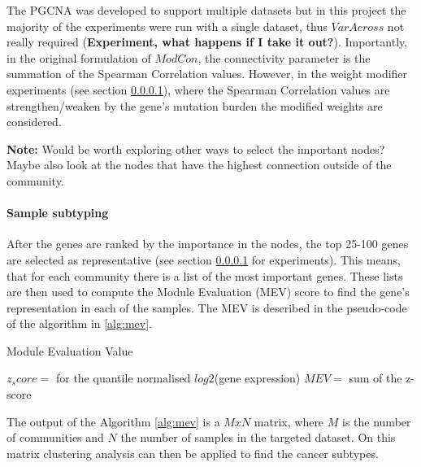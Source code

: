 The PGCNA was developed to support multiple datasets but in this project the majority of the experiments were run with a single dataset, thus $VarAcross$ not really required (\textbf{Experiment, what happens if I take it out?}). Importantly, in the original formulation of $ModCon$, the connectivity parameter is the summation of the Spearman Correlation values. However, in the weight modifier experiments (see section \ref{}), where the Spearman Correlation values are strengthen/weaken by the gene's mutation burden the modified weights are considered.

\textbf{Note:} Would be worth exploring other ways to select the important nodes? Maybe also look at the nodes that have the highest connection outside of the community.

\paragraph{Sample subtyping}

After the genes are ranked by the importance in the nodes, the top 25-100 genes are selected as representative (see section \ref{} for experiments). This means, that for each community there is a list of the most important genes. These  lists are then used to compute the Module Evaluation (MEV) score \citet{Care2019-ij} to find the gene's representation in each of the samples. The MEV is described in the pseudo-code of the algorithm in \ref{alg:mev}.

\begin{algorithm}
\caption{Module Evaluation Value }\label{alg:mev}
    \begin{algorithmic}
            \State $z_score=$ for the quantile normalised $log2$(gene expression)
                \State $MEV=$ sum of the z-score  
            \EndFor
        \EndFor
    \EndFor
    \end{algorithmic}
\end{algorithm}

The output of the Algorithm \ref{alg:mev} is a $MxN$ matrix, where $M$ is the number of communities and $N$ the number of samples in the targeted dataset. On this matrix clustering analysis can then be applied to find the cancer subtypes.


